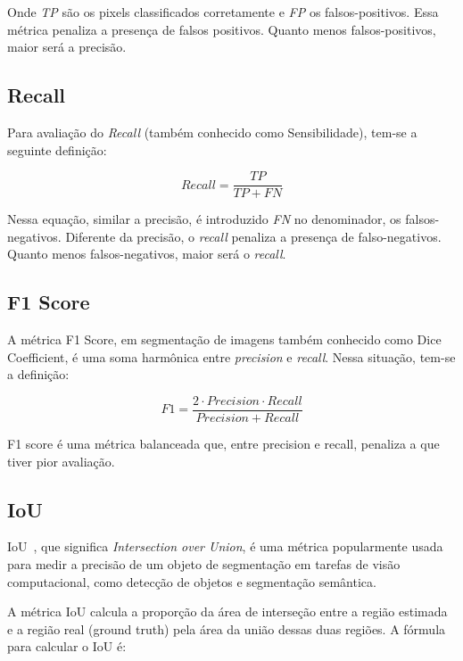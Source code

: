 Onde \textit{TP} são os pixels classificados corretamente e \textit{FP}
os falsos-positivos. Essa métrica penaliza a presença de falsos
positivos. Quanto menos falsos-positivos, maior será a precisão.


\subsection{Recall}\label{sec:recall}

Para avaliação do \textit{Recall} (também conhecido como Sensibilidade), tem-se a seguinte definição:

\begin{equation}\label{eq:recall}
  Recall = \dfrac{TP}{TP + FN}
\end{equation}

Nessa equação, similar a precisão, é introduzido \textit{FN} no denominador,
os falsos-negativos. Diferente da precisão, o \textit{recall} penaliza
a presença de falso-negativos. Quanto menos falsos-negativos, maior
será o \textit{recall}.

\subsection{F1 Score}\label{sec:f1}

A métrica F1 Score, em segmentação de imagens também conhecido como
Dice Coefficient, é uma soma harmônica entre \textit{precision} e
\textit{recall}. Nessa situação, tem-se a definição:


\begin{equation}\label{eq:recall}
  F1 = \dfrac{2 \cdot Precision \cdot Recall}{Precision + Recall}
\end{equation}

F1 score é uma métrica balanceada que, entre precision e recall,
penaliza a que tiver pior avaliação.

\subsection{IoU}\label{sec:iou}

IoU~\cite{rezatofighi2019generalized}, que significa
\textit{Intersection over Union}, é uma métrica popularmente usada
para medir a precisão de um objeto de segmentação em tarefas de visão
computacional, como detecção de objetos e segmentação semântica.

A métrica IoU calcula a proporção da área de interseção entre a região
estimada e a região real (ground truth) pela área da união dessas duas
regiões. A fórmula para calcular o IoU é:

